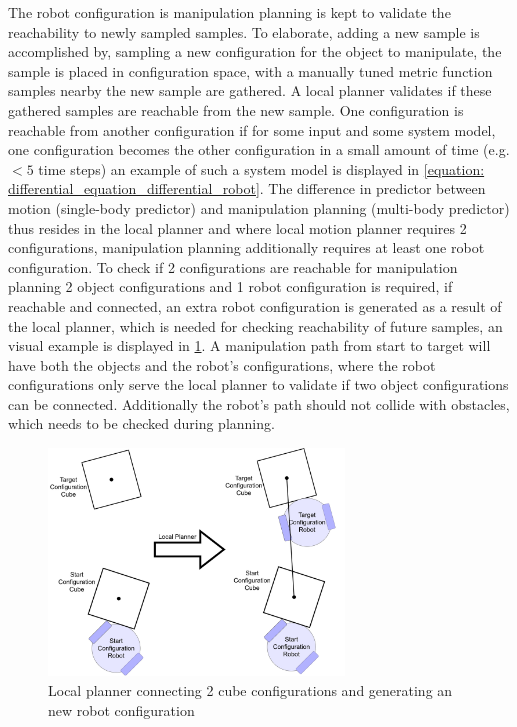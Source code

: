 The robot configuration is manipulation planning is kept to validate the reachability to newly sampled samples. To elaborate, adding a new sample is accomplished by, sampling a new configuration for the object to manipulate, the sample is placed in configuration space, with a manually tuned metric function samples nearby the new sample are gathered. A local planner validates if these gathered samples are reachable from the new sample. One configuration is reachable from another configuration if for some input and some system model, one configuration becomes the other configuration in a small amount of time (e.g. $<5$ time steps) an example of such a system model is displayed in \cref{equation: differential_equation_differential_robot}. The difference in predictor between motion (single-body predictor) and manipulation planning (multi-body predictor) thus resides in the local planner and where local motion planner requires 2 configurations, manipulation planning  additionally requires at least one robot configuration. To check if 2 configurations are reachable for manipulation planning 2 object configurations and 1 robot configuration is required, if reachable and connected, an extra robot configuration is generated as a result of the local planner, which is needed for checking reachability of future samples, an visual example is displayed in \cref{figure: local_planner_manipulation}. A manipulation path from start to target will have both the objects and the robot's configurations, where the robot configurations only serve the local planner to validate if two object configurations can be connected. Additionally the robot's path should not collide with obstacles, which needs to be checked during planning. \\

\begin{figure}[H]
    \centering
    \includegraphics[width=0.7\textwidth]{figures/manipulation_local_planner.png}
    \caption{Local planner connecting 2  cube configurations and generating an new robot configuration}
    \label{figure: local_planner_manipulation}
\end{figure}

